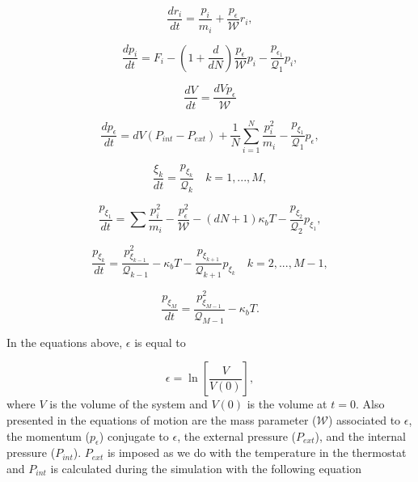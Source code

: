 \begin{equation}
\frac{dr_{i}}{dt} = \frac{p_i}{m_i} + \frac{p_{\epsilon}}{\mathcal{W}} r_i,
\end{equation}

\begin{equation}
\frac{dp_{i}}{dt} = F_i  - \left(1 + \frac{d}{dN}\right) \frac{p_{\epsilon}}{\mathcal{W}} p_{i} - \frac{p_{\epsilon _{1}}}{\mathcal{Q} _1} p_{i},
\end{equation}

\begin{equation}
\frac{dV}{dt} = \frac{d V p_{\epsilon}}{\mathcal{W} }
\end{equation}

\begin{equation}
\frac{dp_{\epsilon}}{dt} = dV (	P_{int} -P_{ext}) + \frac{1}{N} \sum_{i=1}^{N} \frac{p_{i}^{2}}{m_i} - \frac{p_{\xi _{1}}}{{\mathcal{Q} _1}}p_{\epsilon},
\end{equation}

\begin{equation}
\frac{\xi _{k}}{dt} = \frac{p_{\xi _k}}{\mathcal{Q} _{k}} \quad k = 1,...,M ,
\end{equation}

\begin{equation}
\frac{p_{\xi _1}}{dt} = \sum \frac{p_{i}^{2}}{m_{i}} - \frac{p_{\epsilon}^{2}}{\mathcal{W}} -  (dN +1)\kappa_{b}T -\frac{p_{\xi _{2}}}{\mathcal{Q} _2}p_{\xi _{1}},
\end{equation}

\begin{equation}
\frac{p_{\xi _k}}{dt} = \frac{p_{\xi _{k -1}}^{2}}{\mathcal{Q} _{k-1}} - \kappa_{b}T - \frac{p_{\xi _{k+1}}}{\mathcal{Q} _{k+1}}p_{\xi _{k}} \quad k = 2,...,M-1 ,
\end{equation}

\begin{equation}
\frac{p_{\xi _M}}{dt} = \frac{ p_{\xi _{M-1}}^{2}}{\mathcal{Q} _{M-1}} - \kappa_{b}T .
\end{equation}

In the equations above, $\epsilon$ is equal to

\begin{equation}
\epsilon = \ln \left[\frac{V}{V(0)}\right],
\end{equation}
where $V$ is the volume of the system and $V(0)$ is the volume at $t=0$. Also presented in the equations of motion are the mass parameter ($\mathcal{W}$) associated to $\epsilon$, the momentum ($p_{\epsilon}$) conjugate to $\epsilon$, the external pressure ($P_{ext}$), and the internal pressure ($P_{int}$). $P_{ext}$ is imposed as we do with the temperature in the thermostat and $P_{int}$ is calculated during the simulation with the following equation


